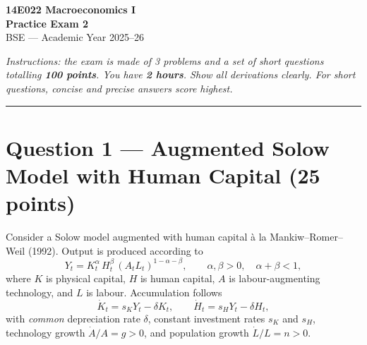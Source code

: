 \documentclass[a4paper,11pt]{article}
\begin{document}

\begin{center}
    {\LARGE \textbf{14E022 Macroeconomics I}}\\[6pt]
    {\Large \textbf{Practice Exam 2}}\\[8pt]
    {\large BSE --- Academic Year 2025--26}
\end{center}

\vspace{8pt}
\noindent\textit{Instructions: the exam is made of 3 problems and a set of short questions
totalling \textbf{100 points}. You have \textbf{2 hours}. Show all derivations clearly.
For short questions, concise and precise answers score highest.}
\vspace{4pt}

\noindent\rule{\textwidth}{0.4pt}

\section{Question 1 --- Augmented Solow Model with Human Capital
\hfill (25 points)}

Consider a Solow model augmented with human capital \`a la Mankiw--Romer--Weil (1992).
Output is produced according to
\[
    Y_t = K_t^{\alpha}\,H_t^{\beta}\,(A_t L_t)^{1-\alpha-\beta},
    \qquad \alpha,\beta > 0,\quad \alpha + \beta < 1,
\]
where $K$ is physical capital, $H$ is human capital, $A$ is labour-augmenting technology,
and $L$ is labour.  Accumulation follows
\[
    \dot{K}_t = s_K Y_t - \delta K_t,\qquad
    \dot{H}_t = s_H Y_t - \delta H_t,
\]
with \emph{common} depreciation rate $\delta$, constant investment rates $s_K$ and $s_H$,
technology growth $\dot{A}/A = g > 0$, and population growth $\dot{L}/L = n > 0$.
\end{document}
